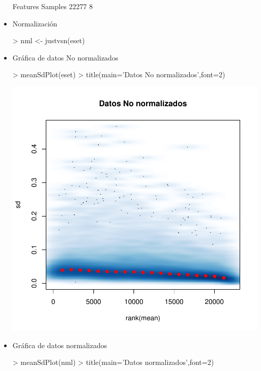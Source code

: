 \documentclass[12pt]{article}
\begin{document}
\begin{itemize}
\begin{Schunk}
\begin{Soutput}
Features  Samples 
   22277        8 
\end{Soutput}
\end{Schunk}
\item{Normalización}
\begin{Schunk}
\begin{Sinput}
> nml <- justvsn(eset)
\end{Sinput}
\end{Schunk}
\item{Gráfica de datos No normalizados}
\begin{Schunk}
\begin{Sinput}
> meanSdPlot(eset)
> title(main='Datos No normalizados',font=2)
\end{Sinput}
\end{Schunk}
\includegraphics{JuanHenao_Taller3-004}
\item{Gráfica de datos normalizados}
\begin{Schunk}
\begin{Sinput}
> meanSdPlot(nml)
> title(main='Datos normalizados',font=2)
\end{Sinput}
\end{Schunk}

\end{itemize}
\end{document}
